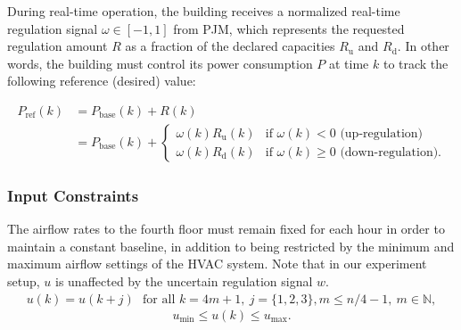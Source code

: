 During real-time operation, the building receives a normalized real-time regulation signal $\omega \in [-1,1]$ from PJM, which represents the requested regulation amount $R$ as a fraction of the declared capacities $R_{\text{u}}$ and $R_{\text{d}}$. In other words, the building must control its power consumption $P$ at time $k$ to track the following reference (desired) value:

\begin{equation}\label{eq:P_ref}
\begin{aligned}
P_{\text{ref}}(k) &= P_{\text{base}}(k)+R(k) \\
	&= P_{\text{base}}(k)+\begin{cases}
	\omega(k) R_{\text{u}}(k) & \mbox{if } \omega(k) < 0 \mbox{ (up-regulation)} \\ 
	\omega(k) R_{\text{d}}(k) & \mbox{if } \omega(k) \geq 0 \mbox{ (down-regulation).} 
	\end{cases} 
\end{aligned}
\end{equation}



\subsubsection{Input Constraints}


The airflow rates to the fourth floor must remain fixed for each hour in order to maintain a constant baseline, in addition to being restricted by the minimum and maximum airflow settings of the HVAC system.
Note that in our experiment setup, $u$ is unaffected by the uncertain regulation signal $w$.
\begin{multline}\label{eq:u_constraint_const}
u(k) = u(k+j) \text{~~for all~} k = 4m+1,~ j = \{1,2,3\}, m \leq n/4-1, ~m \in \mathbb{N},
\end{multline}
\begin{equation}\label{eq:u_constraint}
u_{\text{min}} \leq u(k) \leq u_{\text{max}}.
\end{equation}

